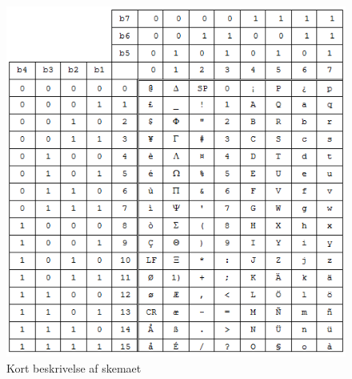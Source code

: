 \begin{figure}[H]
\includegraphics []{Billeder/tegnsaet.png}
\caption {Kort beskrivelse af skemaet}
\end{figure}